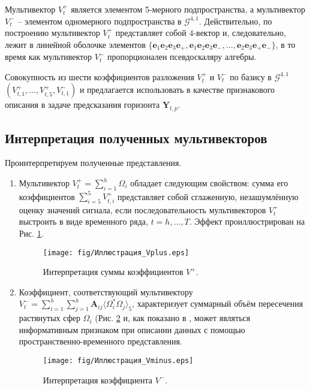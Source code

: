 \documentclass[12pt]{article}
\begin{document}
Мультивектор $V^+_t$ является элементом 5-мерного подпространства, а мультивектор $V^-_t$ -- элементом одномерного подпространства в $\mathcal{G}^{4,1}$. Действительно, по построению мультивектор $V^+_t$ представляет собой $4$-вектор и, следовательно, лежит в линейной оболочке элементов $\{\mathbf{e}_1 \mathbf{e}_2 \mathbf{e}_3 \mathbf{e}_+, \mathbf{e}_1 \mathbf{e}_2 \mathbf{e}_3 \mathbf{e}_-, \dots, \mathbf{e}_2 \mathbf{e}_3 \mathbf{e}_+ \mathbf{e}_- \}$, в то время как мультивектор $V^-_t$ пропорционален псевдоскаляру алгебры.

Совокупность из шести коэффициентов разложения $V^+_t$ и $V^-_t$ по базису в $\mathcal{G}^{4,1}$ $(V_{t,1}^+, \dots, V_{t, 5}^+, V_{t,1}^-)$ и предлагается использовать в качестве признакового описания в задаче предсказания горизонта $\textbf{Y}_{t,p}$.

\newpage
\subsection{Интерпретация полученных мультивекторов}

Проинтерпретируем полученные представления.
\begin{enumerate}
    \item Мультивектор $V^+_t = \sum_{i = 1}^h \Omega_i$ обладает следующим свойством: сумма его коэффициентов $\sum_{i=5}^5 V^+_{t,i}$ представляет собой сглаженную, незашумлённую оценку значений сигнала, если последовательность мультивекторов $V^+_t$ выстроить в виде временного ряда, $t = h, \dots, T$. Эффект проиллюстрирован на Рис. \ref{fig:Vplus}.
    
\vspace{0.5cm}
\begin{figure}[h]
    \centering
    \texttt{[image: fig/Иллюстрация\_Vplus.eps]}
    \caption{Интерпретация суммы коэффициентов $V^+$.}
    \label{fig:Vplus}
\end{figure}
\vspace{0.5cm}

    \item Коэффициент, соответствующий мультивектору $V^-_t = \sum_{i = 1}^h\sum_{j = 1}^h \textbf{A}_{ij}\big\langle \Omega_i^* \Omega_j \big\rangle_5$, характеризует суммарный объём пересечения растянутых сфер $\Omega_i$ (Рис. \ref{fig:Vminus} и, как показано в \cite{Thiruvengadam2020}, может являться информативным признаком при описании данных с помощью пространственно-временного представления.
    
\begin{figure}[h]
    \centering
    \texttt{[image: fig/Иллюстрация\_Vminus.eps]}
    \caption{Интерпретация коэффициента $V^-$.}
    \label{fig:Vminus}
\end{figure}

    
\end{enumerate}
\end{document}
